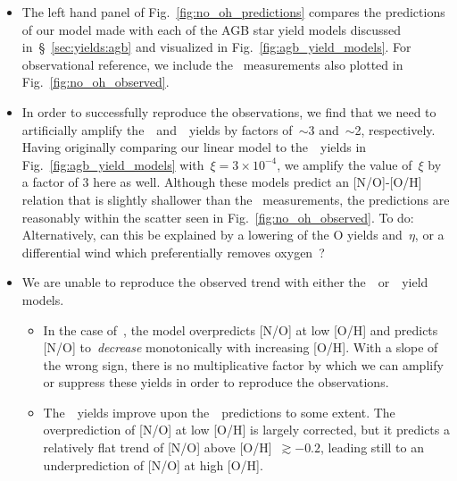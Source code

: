 \documentclass[ms.tex]{subfiles}
\begin{document}
\begin{itemize}
	\item The left hand panel of Fig.~\ref{fig:no_oh_predictions} compares the 
	predictions of our model made with each of the AGB star yield models 
	discussed in~\S~\ref{sec:yields:agb} and visualized in 
	Fig.~\ref{fig:agb_yield_models}. 
	For observational reference, we include the~\citet{Dopita2016} measurements 
	also plotted in Fig.~\ref{fig:no_oh_observed}. 

	\item In order to successfully reproduce the observations, we find that we 
	need to artificially amplify the~\cristallo~and~\ventura~yields by factors 
	of~$\sim$3 and~$\sim$2, respectively. 
	Having originally comparing our linear model to the~\cristallo~yields in 
	Fig.~\ref{fig:agb_yield_models} with~$\xi = 3\times10^{-4}$, we amplify the 
	value of~$\xi$ by a factor of 3 here as well. 
	Although these models predict an [N/O]-[O/H] relation that is slightly 
	shallower than the~\citet{Dopita2016} measurements, the predictions are 
	reasonably within the scatter seen in Fig.~\ref{fig:no_oh_observed}. 
	{\color{red} To do: Alternatively, can this be explained by a lowering of 
	the O yields and~$\eta$, or a differential wind which preferentially 
	removes oxygen~\citep{Vincenzo2016a}}? 

	\item We are unable to reproduce the observed trend with either 
	the~\karakasten~or~\karakas~yield models. 
	\begin{itemize} 
		\item In the case of~\karakasten, the model overpredicts [N/O] at low 
		[O/H] and predicts [N/O] to~\textit{decrease} monotonically with 
		increasing [O/H]. 
		With a slope of the wrong sign, there is no multiplicative factor by 
		which we can amplify or suppress these yields in order to reproduce the 
		observations. 

		\item The~\karakas~yields improve upon the~\karakasten~predictions to 
		some extent. 
		The overprediction of [N/O] at low [O/H] is largely corrected, but it 
		predicts a relatively flat trend of [N/O] above [O/H]~$\gtrsim -0.2$, 
		leading still to an underprediction of [N/O] at high [O/H]. 
	\end{itemize} 


\end{itemize}
\end{document}
